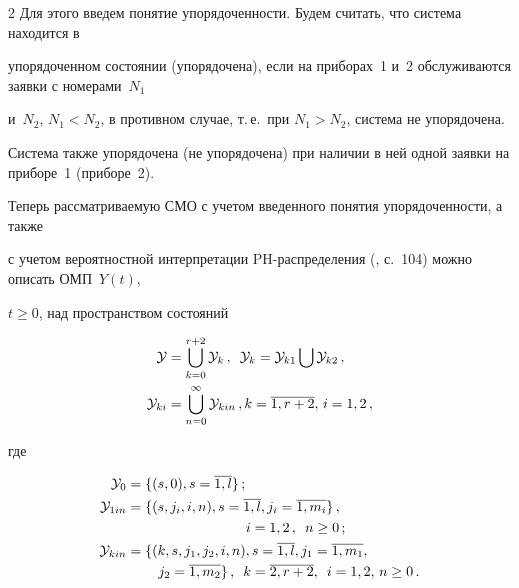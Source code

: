 \begin{multicols}{2}
Для этого введем понятие упорядоченности.  Будем считать, что система находится в 

упорядоченном состоянии (упорядочена), если на приборах~1 и~2 обслуживаются заявки с номерами~$N_1$ 

и~$N_2$, $N_1 < N_2$, в противном случае, т.\,е.\ при $N_1>N_2$, система не упорядочена. 

Система также упорядочена (не упорядочена) при наличии в ней одной заявки на приборе~1 (приборе~2).



Теперь рассматриваемую СМО  с учетом введенного понятия упорядоченности, а также 

с учетом вероятностной интерпретации PH-распределения (\cite{1mat}, с.~104) можно описать ОМП~$Y(t)$, 

$t\geq 0$, над пространством состояний



\noindent

\begin{align*}

\mathcal{Y}&=\bigcup\limits_{k=0}^{r+2}\mathcal{Y}_k\,,\enskip

\mathcal{Y}_k=\mathcal{Y}_{k1}\bigcup\mathcal{Y}_{k2}\,,\\

\mathcal{Y}_{ki}&=\bigcup_{n=0}^{\infty}\mathcal{Y}_{kin}\,,

k=\overline{1,r+2},\, i=1,2\,,

\end{align*}

где

\begin{align*}

\mathcal{Y}_0&=\{(s,0), s=\overline{1,l}\}\,;\\

\mathcal{Y}_{1in}&=\{(s,j_i,i,n), s=\overline{1,l}, j_i=\overline{1,m_i} \}\,, \\

&\hspace*{30mm}i=1,2\,, \enskip n\geq 0\,;\\

\mathcal{Y}_{kin}&=\{(k,s,j_1,j_2,i,n), s=\overline{1,l}, j_1=\overline{1,m_1},\\

&\hspace*{8mm} j_2=\overline{1,m_2}\}\,,\enskip

 k=\overline{2,r+2},\enskip i=1,2,\, n\geq 0\,.


\end{align*}
\end{multicols}
